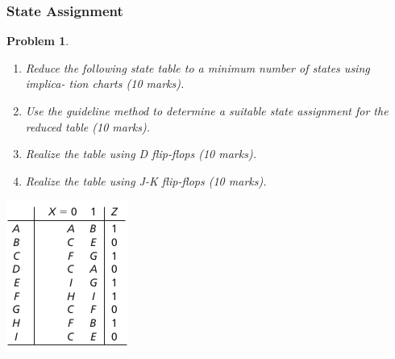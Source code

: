 \documentclass[twocolumn]{article}
\newtheorem{prob}{Problem}
\begin{document}
\subsubsection*{State Assignment}
\begin{prob}
  \begin{enumerate}
  \item Reduce the following state table to a minimum number of states using implica-
    tion charts (10 marks).
  \item Use the guideline method to determine a suitable state assignment for the
    reduced table (10 marks).
  \item Realize the table using D flip-flops (10 marks).
  \item Realize the table using J-K flip-flops (10 marks).
  \end{enumerate}
  \includegraphics[width=\linewidth]{fig-15.25.png}
\end{prob}




\end{document}

